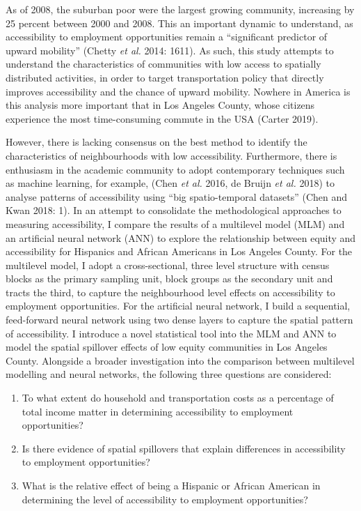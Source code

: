 \documentclass[a4paper,UKenglish]{lipics-v2018}
\begin{document}
As of 2008, the suburban poor were the largest growing community, increasing by 25 percent between 2000 and 2008. This an important dynamic to understand, as accessibility to employment opportunities remain a “significant predictor of upward mobility” (Chetty \textit{et al.} 2014: 1611). As such, this study attempts to understand the characteristics of communities with low access to spatially distributed activities, in order to target transportation policy that directly improves accessibility and the chance of upward mobility. Nowhere in America is this analysis more important that in Los Angeles County, whose citizens experience the most time-consuming commute in the USA (Carter 2019).

However, there is lacking consensus on the best method to identify the characteristics of neighbourhoods with low accessibility. Furthermore, there is enthusiasm in the academic community to adopt contemporary techniques such as machine learning, for example, (Chen \textit{et al.} 2016, de Bruijn \textit{et al.} 2018) to analyse patterns of accessibility using “big spatio-temporal datasets” (Chen and Kwan 2018: 1). In an attempt to consolidate the methodological approaches to measuring accessibility, I compare the results of a multilevel model (MLM) and an artificial neural network (ANN) to explore the relationship between equity and accessibility for Hispanics and African Americans in Los Angeles County. For the multilevel model, I adopt a cross-sectional, three level structure with census blocks as the primary sampling unit, block groups as the secondary unit and tracts the third, to capture the neighbourhood level effects on accessibility to employment opportunities. For the artificial neural network, I build a sequential, feed-forward neural network using two dense layers to capture the spatial pattern of accessibility. I introduce a novel statistical tool into the MLM and ANN to model the spatial spillover effects of low equity communities in Los Angeles County. Alongside a broader investigation into the comparison between multilevel modelling and neural networks, the following three questions are considered:

\begin{itemize}
\begin{enumerate}
\item \label{itm:first} To what extent do household and transportation costs as a percentage of total income matter in determining accessibility to employment opportunities?
\item \label{itm:second} Is there evidence of spatial spillovers that explain differences in accessibility to employment opportunities?
\item \label{itm:third} What is the relative effect of being a Hispanic or African American in determining the level of accessibility to employment opportunities?
\end{enumerate}
\end{itemize} 
\end{document}
